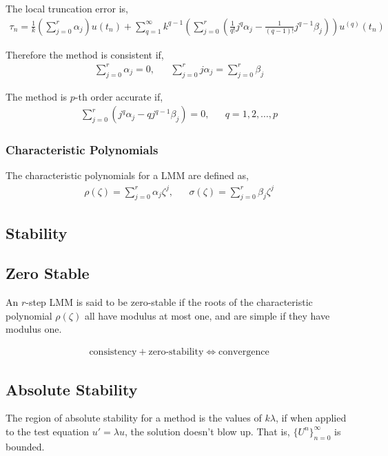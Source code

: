 \documentclass[12pt]{article}
\begin{document}
The local truncation error is,
\begin{align*}
    \tau_n = \frac{1}{k} \left( \sum_{j=0}^{r} \alpha_j \right) u(t_n) + \sum_{q=1}^{\infty} k^{q-1} \left( \sum_{j=0}^{r} \left( \frac{1}{q!}j^q \alpha_j - \frac{1}{(q-1)!}j^{q-1}\beta_j \right)\right) u^{(q)}(t_n)
\end{align*}

Therefore the method is consistent if,
\begin{align*}
    \sum_{j=0}^{r}\alpha_j = 0, && \sum_{j=0}^{r} j \alpha_j = \sum_{j=0}^{r} \beta_j
\end{align*}

The method is \( p \)-th order accurate if,
\begin{align*}
    \sum_{j=0}^{r} \left( j^{q} \alpha_j - q j^{q-1}\beta_j \right) = 0, && q=1,2,\ldots, p 
\end{align*}

\subsubsection{Characteristic Polynomials}
The characteristic polynomials for a LMM are defined as,
\begin{align*}
    \rho(\zeta) = \sum_{j=0}^{r} \alpha_j \zeta^j, && \sigma(\zeta) = \sum_{j=0}^{r} \beta_j \zeta^j
\end{align*}



\subsection{Stability}

\subsection{Zero Stable}
An \( r \)-step LMM is said to be zero-stable if the roots of the characteristic polynomial \( \rho(\zeta) \) all have modulus at most one, and are simple if they have modulus one.

\begin{align*}
    \text{consistency} + \text{zero-stability} \Longleftrightarrow \text{convergence}
\end{align*}


\subsection{Absolute Stability}
The region of absolute stability for a method is the values of \( k\lambda \), if when applied to the test equation \( u' = \lambda u \), the solution doesn't blow up. That is, \( \{ U^n \}_{n=0}^{\infty} \) is bounded.
\end{document}
